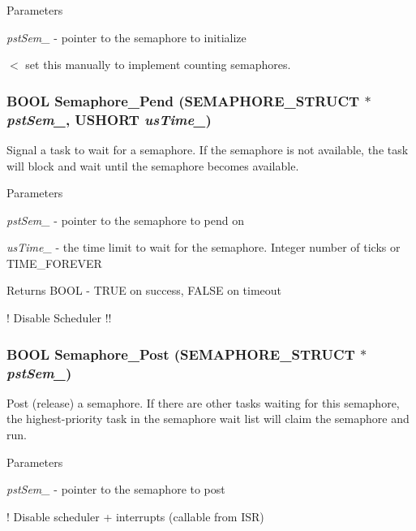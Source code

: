 \begin{DoxyParams}{Parameters}
\item[{\em pstSem\_\-}]-\/ pointer to the semaphore to initialize \end{DoxyParams}


$<$ set this manually to implement counting semaphores. 
\subsubsection[{Semaphore\_\-Pend}]{\setlength{\rightskip}{0pt plus 5cm}BOOL Semaphore\_\-Pend ({\bf SEMAPHORE\_\-STRUCT} $\ast$ {\em pstSem\_\-}, \/  USHORT {\em usTime\_\-})}\label{semaphore_8c_ab4eb90b61e72043afa2a222ce5831083}
Signal a task to wait for a semaphore. If the semaphore is not available, the task will block and wait until the semaphore becomes available.


\begin{DoxyParams}{Parameters}
\item[{\em pstSem\_\-}]-\/ pointer to the semaphore to pend on \item[{\em usTime\_\-}]-\/ the time limit to wait for the semaphore. Integer number of ticks or TIME\_\-FOREVER \end{DoxyParams}
\begin{DoxyReturn}{Returns}
BOOL -\/ TRUE on success, FALSE on timeout 
\end{DoxyReturn}


! Disable Scheduler !! 
\subsubsection[{Semaphore\_\-Post}]{\setlength{\rightskip}{0pt plus 5cm}BOOL Semaphore\_\-Post ({\bf SEMAPHORE\_\-STRUCT} $\ast$ {\em pstSem\_\-})}\label{semaphore_8c_ab774b90aeadeab02ce0596af7265d6c8}
Post (release) a semaphore. If there are other tasks waiting for this semaphore, the highest-\/priority task in the semaphore wait list will claim the semaphore and run.


\begin{DoxyParams}{Parameters}
\item[{\em pstSem\_\-}]-\/ pointer to the semaphore to post \end{DoxyParams}


! Disable scheduler + interrupts (callable from ISR) 